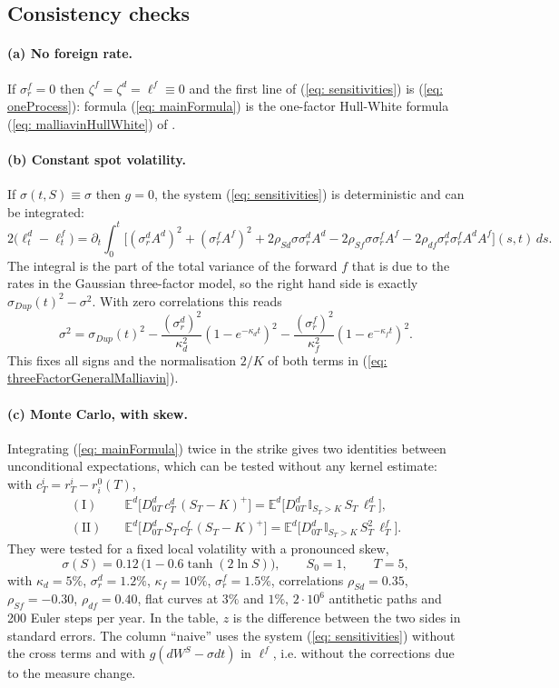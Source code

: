 
\subsection{Consistency checks}\label{subsec: checks}

\paragraph{(a) No foreign rate.} If $\sigma^f_r=0$ then $\zeta^f=\zeta^d=\ell^f\equiv 0$ and the first line of (\ref{eq: sensitivities}) is (\ref{eq: oneProcess}): formula (\ref{eq: mainFormula}) is the one-factor Hull-White formula (\ref{eq: malliavinHullWhite}) of \cite{guyonLabordere}.

\paragraph{(b) Constant spot volatility.} If $\sigma(t,S)\equiv\sigma$ then $g=0$, the system (\ref{eq: sensitivities}) is deterministic and can be integrated:
$$ 2\big(\ell^d_t-\ell^f_t\big)=\partial_t\int_0^t\Big[
(\sigma^d_r A^d)^2+(\sigma^f_r A^f)^2+2\rho_{Sd}\sigma\sigma^d_r A^d-2\rho_{Sf}\sigma\sigma^f_r A^f
-2\rho_{df}\sigma^d_r\sigma^f_r A^dA^f\Big](s,t)\,ds . $$
The integral is the part of the total variance of the forward $f$ that is due to the rates in the Gaussian three-factor model, so the right hand side is exactly $\sigma_{Dup}(t)^2-\sigma^2$. With zero correlations this reads
$$ \sigma^2=\sigma_{Dup}(t)^2-\frac{(\sigma^d_r)^2}{\kappa_d^2}(1-e^{-\kappa_dt})^2-\frac{(\sigma^f_r)^2}{\kappa_f^2}(1-e^{-\kappa_ft})^2 . $$
This fixes all signs and the normalisation $2/K$ of both terms in (\ref{eq: threeFactorGeneralMalliavin}).

\paragraph{(c) Monte Carlo, with skew.} Integrating (\ref{eq: mainFormula}) twice in the strike gives two identities between unconditional expectations, which can be tested without any kernel estimate: with $c^i_T=r^i_T-r^0_i(T)$,
\begin{align*}
\mathrm{(I)}\quad&\mathbb{E}^d\big[D^d_{0T}\,c^d_T\,(S_T-K)^+\big]=\mathbb{E}^d\big[D^d_{0T}\,\mathbb{I}_{S_T>K}\,S_T\,\ell^d_T\big],\\
\mathrm{(II)}\quad&\mathbb{E}^d\big[D^d_{0T}\,S_T\,c^f_T\,(S_T-K)^+\big]=\mathbb{E}^d\big[D^d_{0T}\,\mathbb{I}_{S_T>K}\,S_T^2\,\ell^f_T\big].
\end{align*}
They were tested for a fixed local volatility with a pronounced skew,
$$\sigma(S)=0.12\,\big(1-0.6\tanh(2\ln S)\big),\qquad S_0=1,\qquad T=5,$$
with $\kappa_d=5\%$, $\sigma^d_r=1.2\%$, $\kappa_f=10\%$, $\sigma^f_r=1.5\%$, correlations
$\rho_{Sd}=0.35$, $\rho_{Sf}=-0.30$, $\rho_{df}=0.40$, flat curves at $3\%$ and
$1\%$, $2\cdot10^6$ antithetic paths and 200 Euler steps per year. In the table, $z$ is the difference between the two sides in standard errors. The column ``naive'' uses the system (\ref{eq: sensitivities}) without the cross terms and with $g(dW^S-\sigma dt)$ in $\ell^f$, i.e. without the corrections due to the measure change.

